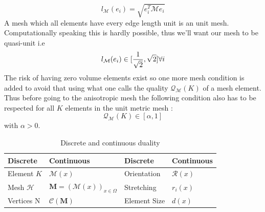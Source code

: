 \documentclass[11pt, a4paper, English]{report}
\begin{document}
\begin{appendix}
$$l_{\mathcal{M}} (e_i) = \sqrt{e_i^T \mathcal{M} e_i}$$
A mesh which all elements have every edge length unit is an unit mesh. Computationally speaking this is hardly possible, thus we'll want our mesh to be quasi-unit i.e 
$$ l_{\mathcal{M}} (e_i) \in [\frac{1}{\sqrt{2}}, \sqrt{2}] \space  \forall i $$
The risk of having zero volume elements exist so one more mesh condition is added to avoid that using what one calls the quality $\mathcal{Q}_{\mathcal{M}}(K)$ of a mesh element. Thus before going to the anisotropic mesh the following condition also has to be respected for all $K$ elements in the unit metric mesh :
$$\mathcal{Q}_{\mathcal{M}}(K) \in [\alpha, 1]$$ 
with $\alpha > 0$. 

\begin{table}[h!]
\centering
\begin{tabular}{llll}
\hline
Discrete                                & Continuous                                                             & Discrete                          & Continuous       \\ \hline
\multicolumn{1}{l|}{Element $K$}        & \multicolumn{1}{l|}{$\mathcal{M}(x)$}                                  & \multicolumn{1}{l|}{Orientation}  & $\mathcal{R}(x)$ \\
\multicolumn{1}{l|}{Mesh $\mathcal{H}$} & \multicolumn{1}{l|}{$\boldsymbol{M}=(\mathcal{M}(x))_{x \in \Omega}$} & \multicolumn{1}{l|}{Stretching}   & $r_i (x)$        \\
\multicolumn{1}{l|}{Vertices N}         & \multicolumn{1}{l|}{$\mathcal{C}(\boldsymbol{M})$}                     & \multicolumn{1}{l|}{Element Size} & $d(x)$          
\end{tabular}
\caption{Discrete and continuous duality}
\end{table}

\end{appendix}
\end{document}
